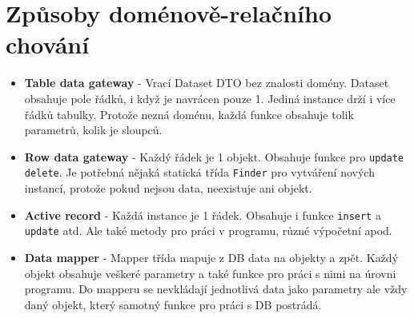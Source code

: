 \section{Způsoby doménově-relačního chování}
\begin{itemize}
    \item \textbf{Table data gateway} - Vrací Dataset DTO bez znalosti domény. Dataset obsahuje pole řádků, i když je navrácen pouze 1. Jediná instance drží i více řádků tabulky. Protože nezná doménu, každá funkce obsahuje tolik parametrů, kolik je sloupců.
    \item \textbf{Row data gateway} - Každý řádek je 1 objekt. Obsahuje funkce pro \texttt{update} \texttt{delete}. Je potřebná nějaká statická třída \texttt{Finder} pro vytváření nových instancí, protože pokud nejsou data, neexistuje ani objekt.
    \item \textbf{Active record} - Každá instance je 1 řádek. Obsahuje i funkce \texttt{insert} a \texttt{update} atd. Ale také metody pro práci v programu, různé výpočetní apod.
    \item \textbf{Data mapper} - Mapper třída mapuje z DB data na objekty a zpět. Každý objekt obsahuje veškeré parametry a také funkce pro práci s nimi na úrovni programu. Do mapperu se nevkládají jednotlivá data jako parametry ale vždy daný objekt, který samotný funkce pro práci s DB postrádá.
\end{itemize}
